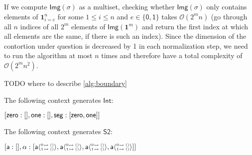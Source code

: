 \documentclass[11pt]{article}
\theoremstyle{definition}
\newcommand{\continuation}{??}
\newenvironment{examplecontd}[1]
{\renewcommand{\continuation}{\ref{#1}}\expcont[continued]}
{\endexpcont}
\newcommand{\todo}[1]{
  \begin{tcolorbox}
    TODO {#1} 
  \end{tcolorbox}
}
\newcommand{\mlist}[1]{[ {#1} ]}
\newcommand{\pint}[1]{\mathbf{1}^{#1}}
\newcommand{\pintrestr}[3]{\mathbf{1}^{#1}_{{#2}={#3}}}
\newcommand{\izero}{\mathsf{0}}
\newcommand{\ione}{\mathsf{1}}
\newcommand{\image}[1]{\textsf{Img}({#1})}
\renewcommand{\dim}[1]{\mathsf{dim}({#1})}
\newcommand{\cont}[2]{ \ifthenelse{\equal{#2}{}}{#1}{{#1}\langle{#2}\rangle} }
\newcommand{\cset}[1]{\mathsf{{#1}}}
\newcommand{\comp}[2]{\mathsf{Comp}({#1}\ {#2})}
\newcommand{\substtwo}[2]{\tiny
  \arraycolsep=.4pt\def\arraystretch{1}
  \begin{array}{ll}
    0 &\mapsto {#1} \\
    1 &\mapsto {#2}
  \end{array}
}
\newcommand{\oneconst}{\substtwo{()}{()}}
\begin{document}
If we compute $\image{\sigma}$ as a multiset, checking whether 
$\image{\sigma}$ only contains elements of $\pintrestr{n}{i}{e}$ for
some $1 \leq i \leq n$ and $e \in \{\izero,\ione\}$ takes $\mathcal{O}(2^mn)$
(go through all $n$ indices of all $2^m$ elements of $\image{\pint{m}}$ and
return the first index at which all elements are the same, if there is such an index).
Since the dimension of the contortion under question is decreased by 1 in each
normalization step, we need to run the algorithm at most $n$ times and therefore
have a total complexity of $\mathcal{O}(2^mn^2)$.



\todo{where to describe \autoref{alg:boundary} }





\begin{examplecontd}{exp:int}
  The following context generates $\cset{Int}$:
  
  $\mlist{ \cset{zero} : \mlist{} , \cset{one} : \mlist{} , \cset{seg} : \mlist{
      \cont{\cset{zero}}{}, \cont{\cset{one}}{} }}$
\end{examplecontd}

\begin{examplecontd}{exp:sndsphere}
  The following context generates $\cset{S2}$:

  $\mlist{ \cset{a} : \mlist{} , \cset{\alpha} : \mlist{ \cont{\cset{a}}{\oneconst} , \cont{\cset{a}}{\oneconst} ,
  \cont{\cset{a}}{\oneconst}, \cont{\cset{a}}{\oneconst} }}$
  
\end{examplecontd}
\end{document}
